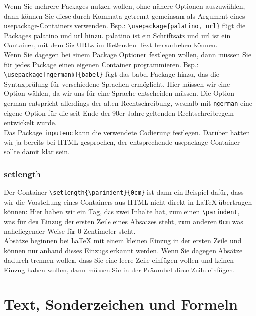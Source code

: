 Wenn Sie mehrere Packages nutzen wollen, ohne nähere Optionen auszuwählen, dann können Sie diese durch Kommata getrennt gemeinsam als Argument eines usepackage-Containers verwenden. Bsp.: \verb|\usepackage{palatino, url}| fügt die Packages palatino und url hinzu. palatino ist ein Schriftsatz und url ist ein Container, mit dem Sie URLs im fließenden Text hervorheben können.\\

Wenn Sie dagegen bei einem Package Optionen festlegen wollen, dann müssen Sie für jedes Package einen eigenen Container programmieren. Bsp.: \verb|\usepackage[ngermanb]{babel}| fügt das babel-Package hinzu, das die Syntaxprüfung für verschiedene Sprachen ermöglicht. Hier müssen wir eine Option wählen, da wir uns für eine Sprache entscheiden müssen. Die Option german entspricht allerdings der alten Rechtschreibung, weshalb mit \verb|ngerman| eine eigene Option für die seit Ende der 90er Jahre geltenden Rechtschreibregeln entwickelt wurde.\\

Das Package \verb|inputenc| kann die verwendete Codierung festlegen. Darüber hatten wir ja bereits bei HTML gesprochen, der entsprechende usepackage-Container sollte damit klar sein.

\subsubsection{setlength}

Der Container \verb|\setlength{\parindent}{0cm}| ist dann ein Beispiel dafür, dass wir die Vorstellung eines Containers aus HTML nicht direkt in LaTeX übertragen können: Hier haben wir ein \glqq{}Tag\grqq{}, das zwei Inhalte hat, zum einen \verb|\parindent|, was für den Einzug der ersten Zeile eines Absatzes steht, zum anderen \verb|0cm| was naheliegender Weise für 0 Zentimeter steht.\\

Absätze beginnen bei LaTeX mit einem kleinen Einzug in der ersten Zeile und können nur anhand dieses Einzugs erkannt werden. Wenn Sie dagegen Absätze dadurch trennen wollen, dass Sie eine leere Zeile einfügen wollen und keinen Einzug haben wollen, dann müssen Sie in der Präambel diese Zeile einfügen.\\

\section{Text, Sonderzeichen und Formeln}

